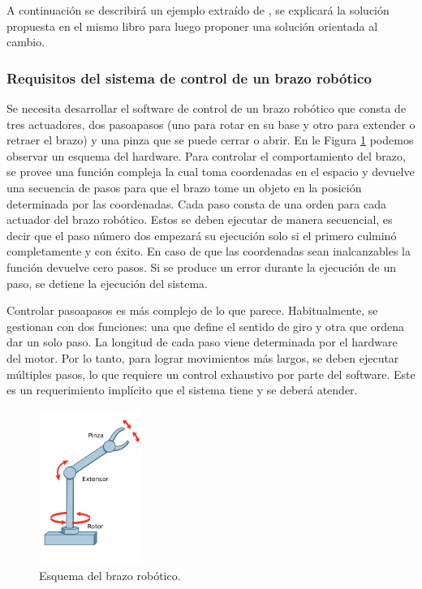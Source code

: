 A continuación se describirá un ejemplo extraído de \cite[Sección 3.4]{douglass}, se explicará la solución propuesta en el mismo libro para luego proponer una solución orientada al cambio.

\subsubsection*{Requisitos del sistema de control de un brazo robótico}
\label{requisitos}

Se necesita desarrollar el software de control de un brazo robótico que consta de tres \gls{actuadores}, dos \glspl{pasoapaso} (uno para rotar en su base y otro para extender o retraer el brazo) y una pinza que se puede cerrar o abrir. En le Figura \ref{brazoEsquema} podemos observar un esquema del hardware. Para controlar el comportamiento del brazo, se provee una función compleja la cual toma coordenadas en el espacio y devuelve una secuencia de pasos para que el brazo tome un objeto en la posición determinada por las coordenadas. Cada paso consta de una orden para cada actuador del brazo robótico. Estos se deben ejecutar de manera secuencial, es decir que el paso número dos empezará su ejecución solo si el primero culminó completamente y con éxito. En caso de que las coordenadas sean inalcanzables la función devuelve cero pasos. Si se produce un error durante la ejecución de un paso, se detiene la ejecución del sistema.

Controlar \glspl{pasoapaso} es más complejo de lo que parece. Habitualmente, se gestionan con dos funciones: una que define el sentido de giro y otra que ordena dar un solo paso. La longitud de cada paso viene determinada por el hardware del motor. Por lo tanto, para lograr movimientos más largos, se deben ejecutar múltiples pasos, lo que requiere un control exhaustivo por parte del software. Este es un requerimiento implícito que el sistema tiene y se deberá atender.

\begin{figure}[H]
\caption{Esquema del brazo robótico.}
\label{brazoEsquema}
\begin{centering}
{\includegraphics[width=0.3\textwidth]{brazo3.png}\par}
\end{centering}
\end{figure}

